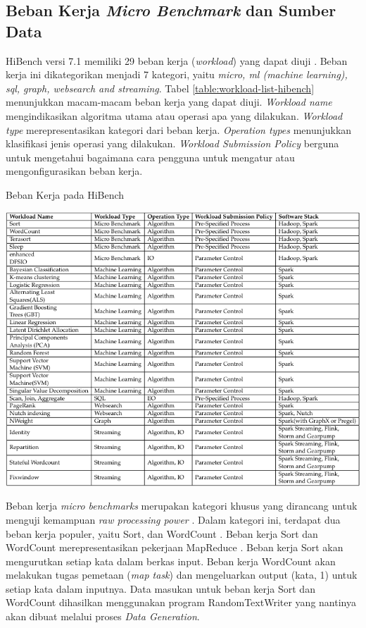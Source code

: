 \subsection{Beban Kerja \textit{Micro Benchmark} dan Sumber Data}
HiBench versi 7.1 memiliki 29 beban kerja (\textit{workload}) yang dapat diuji \cite{IntelbigdataHiBench2023}. Beban kerja ini dikategorikan menjadi 7 kategori, yaitu \textit{micro, ml (machine learning), sql, graph, websearch and streaming}. Tabel \ref{table:workload-list-hibench} menunjukkan macam-macam beban kerja yang dapat diuji. \textit{Workload name} mengindikasikan algoritma utama atau operasi apa yang dilakukan. \textit{Workload type} merepresentasikan kategori dari beban kerja. \textit{Operation types} menunjukkan klasifikasi jenis operasi yang dilakukan. \textit{Workload Submission Policy} berguna untuk mengetahui bagaimana cara pengguna untuk mengatur atau mengonfigurasikan beban kerja.

\begin{table}[h]
  \centering
  \caption{Beban Kerja pada HiBench \cite{barosenAnalysisComparisonInterfacing2018}}
  \includegraphics[width=1\textwidth]{figures/ch02/workload-hibench}
  \label{table:workload-list-hibench}
\end{table}

Beban kerja \textit{micro benchmarks} merupakan kategori khusus yang dirancang untuk menguji kemampuan \textit{raw processing power} \cite{barosenAnalysisComparisonInterfacing2018}. Dalam kategori ini, terdapat dua beban kerja populer, yaitu Sort, dan WordCount \cite{huangHiBenchBenchmarkSuitea}. Beban kerja Sort dan WordCount merepresentasikan pekerjaan MapReduce \cite{deanMapReduceSimplifiedData2004}. Beban kerja Sort akan mengurutkan setiap kata dalam berkas input. Beban kerja WordCount akan melakukan tugas pemetaan (\textit{map task}) dan mengeluarkan output (kata, 1) untuk setiap kata dalam inputnya.  Data masukan untuk beban kerja Sort dan WordCount dihasilkan menggunakan program RandomTextWriter yang nantinya akan dibuat melalui proses \textit{Data Generation}. 

